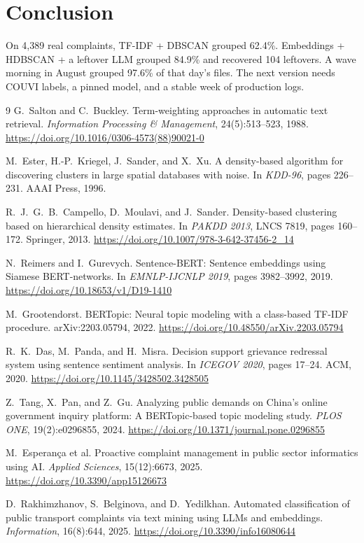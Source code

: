 \documentclass[11pt,a4paper]{article}
\begin{document}
\section{Conclusion}
On 4{,}389 real complaints, TF-IDF + DBSCAN grouped 62.4\%. Embeddings + HDBSCAN + a leftover LLM grouped 84.9\% and recovered 104 leftovers. A wave morning in August grouped 97.6\% of that day's files. The next version needs COUVI labels, a pinned model, and a stable week of production logs.

\begin{thebibliography}{9}
G.~Salton and C.~Buckley. Term-weighting approaches in automatic text retrieval. \textit{Information Processing \& Management}, 24(5):513--523, 1988. \url{https://doi.org/10.1016/0306-4573(88)90021-0}

M.~Ester, H.-P.~Kriegel, J.~Sander, and X.~Xu. A density-based algorithm for discovering clusters in large spatial databases with noise. In \textit{KDD-96}, pages 226--231. AAAI Press, 1996.

R.~J.~G.~B.~Campello, D.~Moulavi, and J.~Sander. Density-based clustering based on hierarchical density estimates. In \textit{PAKDD 2013}, LNCS 7819, pages 160--172. Springer, 2013. \url{https://doi.org/10.1007/978-3-642-37456-2_14}

N.~Reimers and I.~Gurevych. Sentence-BERT: Sentence embeddings using Siamese BERT-networks. In \textit{EMNLP-IJCNLP 2019}, pages 3982--3992, 2019. \url{https://doi.org/10.18653/v1/D19-1410}

M.~Grootendorst. BERTopic: Neural topic modeling with a class-based TF-IDF procedure. arXiv:2203.05794, 2022. \url{https://doi.org/10.48550/arXiv.2203.05794}

R.~K.~Das, M.~Panda, and H.~Misra. Decision support grievance redressal system using sentence sentiment analysis. In \textit{ICEGOV 2020}, pages 17--24. ACM, 2020. \url{https://doi.org/10.1145/3428502.3428505}

Z.~Tang, X.~Pan, and Z.~Gu. Analyzing public demands on China's online government inquiry platform: A BERTopic-based topic modeling study. \textit{PLOS ONE}, 19(2):e0296855, 2024. \url{https://doi.org/10.1371/journal.pone.0296855}

M.~Esperan\c{c}a et al. Proactive complaint management in public sector informatics using AI. \textit{Applied Sciences}, 15(12):6673, 2025. \url{https://doi.org/10.3390/app15126673}

D.~Rakhimzhanov, S.~Belginova, and D.~Yedilkhan. Automated classification of public transport complaints via text mining using LLMs and embeddings. \textit{Information}, 16(8):644, 2025. \url{https://doi.org/10.3390/info16080644}
\end{thebibliography}
\end{document}
